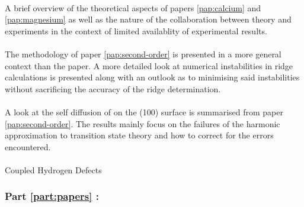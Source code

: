 \paragraph{}
A brief overview of the theoretical aspects of papers \ref{pap:calcium} and \ref{pap:magnesium} as well as the nature of the collaboration between theory and experiments in the context of limited availablity of experimental results.

\paragraph{}
The methodology of paper \ref{pap:second-order} is presented in a more general context than the paper.
A more detailed look at numerical instabilities in ridge calculations is presented along with an outlook as to minimising said instabilities without sacrificing the accuracy of the ridge determination.

\paragraph{}
A look at the self diffusion of  on the (100) surface is summarised from paper \ref{pap:second-order}.
The results mainly focus on the failures of the harmonic approximation to transition state theory and how to correct for the errors encountered.

\paragraph{}
Coupled Hydrogen Defects \expand

\subsubsection{Part \ref{part:papers} : }
\placeholder
